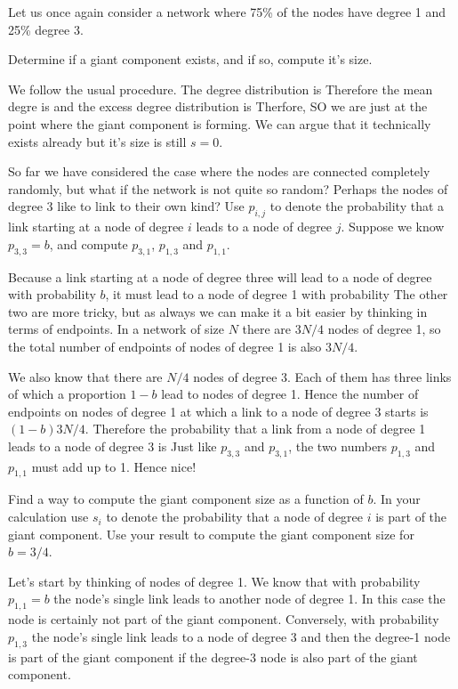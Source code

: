 Let us once again consider a network where 75\% of the nodes have degree 1 and 25\% degree 3. 

\subquestion 
Determine if a giant component exists, and if so, compute it's size.

\solution
We follow the usual procedure. The degree distribution is 
Therefore the mean degre is 
and the excess degree distribution is 
Therfore,
SO we are just at the point where the giant component is forming. We can argue that it technically exists already but it's size is still 
$s=0$.

\subquestion
So far we have considered the case where the nodes are connected completely randomly, but what if the network is not quite so random? Perhaps the nodes of degree 3 like to link to their own kind? Use $p_{i,j}$ to denote the probability that a link starting at a node of degree $i$ leads to a node of degree $j$. Suppose we know $p_{3,3}=b$, and compute $p_{3,1}$, $p_{1,3}$ and $p_{1,1}$.

\solution
Because a link starting at a node of degree three will lead to a node of degree with probability $b$, it must lead to a node of degree 1 with probability 
The other two are more tricky, but as always we can make it a bit easier by thinking in terms of endpoints. In a network of size $N$ there are $3N/4$ nodes of degree 1, so the total number of endpoints of nodes of degree 1 is also $3N/4$. 

We also know that there are $N/4$ nodes of degree 3. Each of them has three links of which a proportion $1-b$ lead to nodes of degree 1. Hence the number of endpoints on nodes of degree 1 at which a link to a node of degree 3 starts is $(1-b)3N/4$. Therefore the probability that a link from a node of degree 1 leads to a node of degree 3 is 
Just like $p_{3,3}$ and $p_{3,1}$, the two numbers $p_{1,3}$ and $p_{1,1}$ must add up to 1. Hence 
nice!

\subquestion 
Find a way to compute the giant component size as a function of $b$. In your calculation use $s_i$ to denote the probability that a node of degree $i$ is part of the giant component. Use your result to compute the giant component size for $b=3/4$.

\solution
 Let's start by thinking of nodes of degree 1. We know that with probability $p_{1,1}=b$ the node's single link leads to another node of degree 1. In this case the node is certainly not part of the giant component. Conversely, with probability $p_{1,3}$ the node's single link leads to a node of degree 3 and then the degree-1 node is part of the giant component if the degree-3 node is also part of the giant component. 
 
